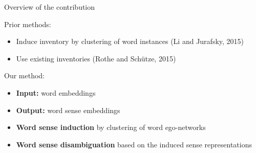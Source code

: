 \documentclass[accentcolor=tud9c,colorbacktitle,inverttitle,landscape,german,presentation]{tudbeamer}
\begin{document}
\begin{frame}{Overview of the contribution}

	\begin{block}{Prior methods:}
		\vspace{0.25cm}

	\begin{itemize}	
	\item Induce inventory by \alert{clustering of word instances} (Li and Jurafsky, 2015)
	\item Use existing inventories (Rothe and Sch\"{u}tze, 2015)	
	\end{itemize}
\end{block}


	\begin{block}{Our method:}
		\vspace{0.25cm}

	\begin{itemize}	
	\item \textbf{Input:} word embeddings
	\item \textbf{Output:} word sense embeddings
	\item \textbf{Word sense induction} by \alert{clustering of word ego-networks}
	\item \textbf{Word sense disambiguation} based on the induced sense representations
	
	\end{itemize}
\end{block}

%	
%	
%	
\end{frame}
\end{document}
